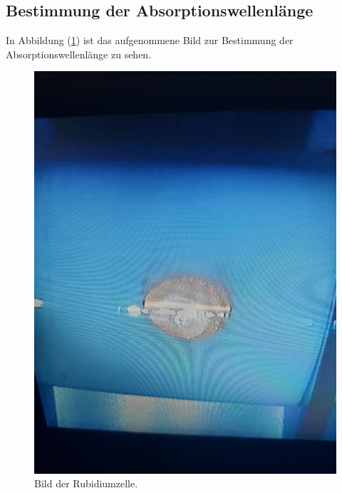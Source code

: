 \subsection{Bestimmung der Absorptionswellenlänge}
\label{sec:über2}
In Abbildung (\ref{fig:mess3}) ist das aufgenommene Bild zur Bestimmung der Absorptionswellenlänge zu sehen.
\begin{figure}[h!]
  \centering
  \includegraphics[scale=0.1]{fig/fluor.jpeg}
  \caption{Bild der Rubidiumzelle.}
  \label{fig:mess3}
\end{figure}
\FloatBarrier
